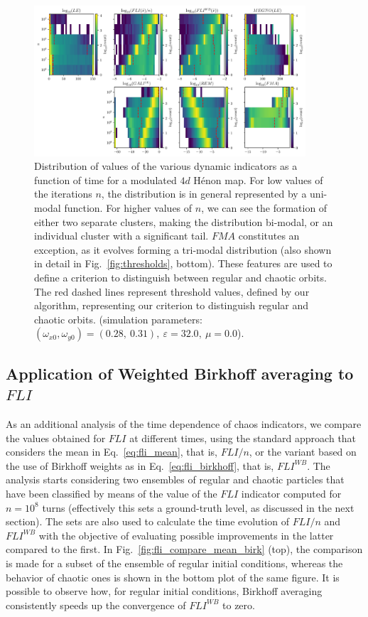 \begin{figure}[htp]
    \centering
    \includegraphics[width=0.9\textwidth]{6_dynamic_indicators/figs/evolution.pdf}
    \caption{Distribution of values of the various dynamic indicators as a function of time for a modulated $4d$ Hénon map. For low values of the  iterations $n$, the distribution is in general represented by a uni-modal function. For higher values of $n$, we can see the formation of either two separate clusters, making the distribution bi-modal, or an individual cluster with a significant tail. $FMA$ constitutes an exception, as it evolves forming a tri-modal distribution (also shown in detail in Fig.~\ref{fig:thresholds}, bottom). These features are used to define a criterion to distinguish between regular and chaotic orbits. The red dashed lines represent threshold values, defined by our algorithm, representing our criterion to distinguish regular and chaotic orbits. (simulation parameters: $(\omega_{x0},\omega_{y0})= (0.28,\ 0.31),\ \varepsilon=32.0,\ \mu=0.0$).}
    \label{fig:generic_example_2}
\end{figure}

%
\subsection{Application of Weighted Birkhoff averaging to $FLI$}
%
As an additional analysis of the time dependence of chaos indicators, we compare the values obtained for $FLI$ at different times, using the standard approach that considers the mean in Eq.~\eqref{eq:fli_mean}, that is, $FLI/n$, or the variant based on the use of Birkhoff weights as in Eq.~\eqref{eq:fli_birkhoff}, that is, $FLI^{WB}$. The analysis starts considering two ensembles of regular and chaotic particles that have been classified by means of the value of the $FLI$ indicator computed for $n=10^8$ turns (effectively this sets a ground-truth level, as discussed in the next section). The sets are also used to calculate the time evolution of $FLI/n$ and $FLI^{WB}$ with the objective of evaluating possible improvements in the latter compared to the first. In Fig.~\ref{fig:fli_compare_mean_birk} (top), the comparison is made for a subset of the ensemble of regular initial conditions, whereas the behavior of chaotic ones is shown in the bottom plot of the same figure. It is possible to observe how, for regular initial conditions, Birkhoff averaging consistently speeds up the convergence of $FLI^{WB}$ to zero.

